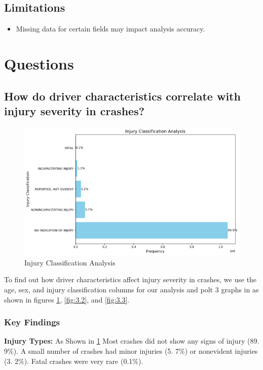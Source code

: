\documentclass[a4paper,10pt]{article}
\begin{document}
\subsection{Limitations}
\begin{itemize}
    \item Missing data for certain fields may impact analysis accuracy.

\end{itemize}

\newpage
\section{Questions}

\subsection{How do driver characteristics correlate with injury severity in crashes?}

\begin{figure}
    \centering
    \includegraphics[width=0.75\linewidth]{images/injury-classification-analysis.png}
    \caption{Injury Classification Analysis}
    \label{fig:3.1}
\end{figure}

To find out how driver characteristics affect injury severity in crashes, we use the age, sex, and injury classification columns for our analysis and polt 3 graphs in as shown in figures \ref{fig:3.1}, \ref{fig:3.2}, and \ref{fig:3.3}.
\subsubsection{Key Findings}

\textbf{Injury Types:}
As Shown in \ref{fig:3.1} Most crashes did not show any signs of injury (89. 9\%). A small number of crashes had minor injuries (5. 7\%) or nonevident injuries (3. 2\%). Fatal crashes were very rare (0.1\%).
\end{document}
